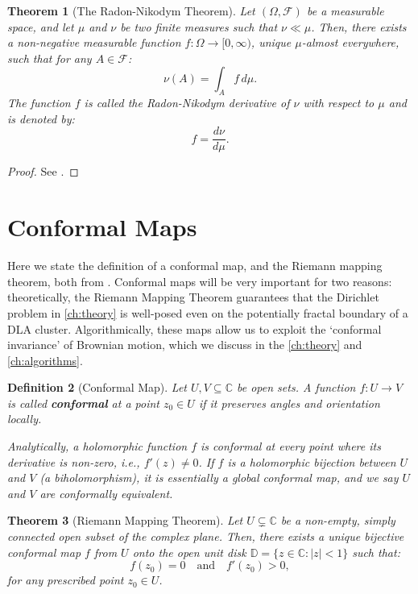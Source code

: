 \documentclass[12pt, a4paper, oneside]{report}
\newtheorem{theorem}{Theorem}[chapter]
\newtheorem{definition}[theorem]{Definition}
\theoremstyle{remark}
\begin{document}
\begin{theorem}[The Radon-Nikodym Theorem]
Let $(\Omega, \mathcal{F})$ be a measurable space, and let $\mu$ and $\nu$ be two finite measures such that $\nu \ll \mu$. Then, there exists a non-negative measurable function $f \colon \Omega \to [0, \infty)$, unique $\mu$-almost everywhere, such that for any $A \in \mathcal{F}$:
\begin{equation*}
    \nu(A) = \int_A f \, d\mu.
\end{equation*}
The function $f$ is called the Radon-Nikodym derivative of $\nu$ with respect to $\mu$ and is denoted by:
\begin{equation*}
    f = \frac{d\nu}{d\mu}.
\end{equation*}
\end{theorem}

\begin{proof}
See \citet[Section 14.13]{Williams1991}.
\end{proof}


\section{Conformal Maps}

Here we state the definition of a conformal map, and the Riemann mapping theorem, both from \citet{Ahlfors1979}. Conformal maps will be very important for two reasons: theoretically, the Riemann Mapping Theorem guarantees that the Dirichlet problem in \cref{ch:theory} is well-posed even on the potentially fractal boundary of a DLA cluster. Algorithmically, these maps allow us to exploit the `conformal invariance' of Brownian motion, which we discuss in the \cref{ch:theory} and \cref{ch:algorithms}.
\begin{definition}[Conformal Map]
Let $U, V \subseteq \mathbb{C}$ be open sets. A function $f \colon U \to V$ is called \textbf{conformal} at a point $z_0 \in U$ if it preserves angles and orientation locally. 

Analytically, a holomorphic function $f$ is conformal at every point where its derivative is non-zero, i.e., $f'(z) \neq 0$. If $f$ is a holomorphic bijection between $U$ and $V$ (a biholomorphism), it is essentially a global conformal map, and we say $U$ and $V$ are conformally equivalent.
\end{definition}

\begin{theorem}[Riemann Mapping Theorem]
Let $U \subsetneq \mathbb{C}$ be a non-empty, simply connected open subset of the complex plane. Then, there exists a unique bijective conformal map $f$ from $U$ onto the open unit disk $\mathbb{D} = \{z \in \mathbb{C} : |z| < 1\}$ such that:
\begin{equation*}
    f(z_0) = 0 \quad \text{and} \quad f'(z_0) > 0,
\end{equation*}
for any prescribed point $z_0 \in U$.
\end{theorem}
\end{document}
